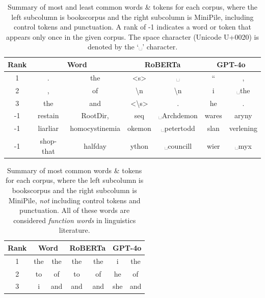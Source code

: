 \documentclass[11pt]{article}
\begin{document}
\begin{table}
    \centering
    \begin{tabular}{|c|c|c|c|c|c|c|}
        \hline
        \textbf{Rank} & \multicolumn{2}{c|}{\textbf{Word}} & \multicolumn{2}{c|}{\textbf{RoBERTa}} & \multicolumn{2}{c|}{\textbf{GPT-4o}}  \\
        \hline
        1 & . & the & <s> & ␣ & `` & , \\
        \hline
        2 & , & of & \textbackslash n & \textbackslash n & i & ␣the \\
        \hline
        3 & the & and & <\textbackslash s> & . & he & . \\
        \hline
        -1 & restain & RootDir, & seq & ␣Archdemon & wares & aryny \\
        \hline
        -1 & liarliar & homocystinemia & okemon & ␣petertodd & slan & verlening \\
        \hline
        -1 & shop-that & halfday & ython & ␣councill & wier & ␣myx \\
        \hline
    \end{tabular}
    \caption{Summary of most and least common words \& tokens for each corpus, where the left subcolumn is bookscorpus and the right subcolumn is MiniPile, including control tokens and punctuation. A rank of -1 indicates a word or token that appears only once in the given corpus. The space character (Unicode U+0020) is denoted by the `␣' character. }
    \label{tbl:token ranks}
\end{table}

\begin{table}
    \centering
    \begin{tabular}{|c|c|c|c|c|c|c|}
        \hline
        \textbf{Rank} & \multicolumn{2}{c|}{\textbf{Word}} & \multicolumn{2}{c|}{\textbf{RoBERTa}} & \multicolumn{2}{c|}{\textbf{GPT-4o}}  \\
        \hline
        1 & the & the & the & the & i & the \\
        \hline
        2 & to & of & to & of & he & of \\
        \hline
        3 & i & and & and & and & she & and \\
        \hline
    \end{tabular}
    \caption{Summary of most common words \& tokens for each corpus, where the left subcolumn is bookscorpus and the right subcolumn is MiniPile, \textit{not} including control tokens and punctuation. All of these words are considered \textit{function words} in linguistics literature.}
    \label{tbl:token ranks no control}
\end{table}
\end{document}
